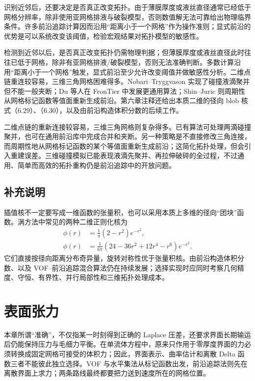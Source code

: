 \documentclass[11pt,a4paper,openany,fontset=none]{ctexbook}
\begin{document}
识别近邻后，还要决定是否真正改变拓扑。由于薄膜厚度或液丝直径通常已经低于网格分辨率，除非使用亚网格排液与破裂模型，否则数值解无法可靠给出物理临界条件。许多前沿追踪计算因而沿用“距离小于一个网格”作为操作准则；显式前沿的优势是可以系统改变该阈值，检验宏观结果对拓扑模型的敏感性。

检测到近邻以后，是否真正改变拓扑仍需物理判据；但薄膜厚度或液丝直径此时往往已低于网格，除非有亚网格排液/破裂模型，否则无法准确判断。多数计算沿用“距离小于一个网格”触发，显式前沿至少允许改变阈值并做敏感性分析。二维点链重连较容易，三维三角网格困难得多。Nobari--Tryggvason 实现了碰撞液滴聚并但不能一般夹断；Du 等人在 FronTier 中发展更通用算法；Shin--Juric 则周期性从网格标记函数等值面重新生成前沿。第六章注释还给出本质二维的径向 blob 核式（6.29）、（6.30），以及由前沿构造体积分数的后续工作。

二维点链的重新连接较容易，三维三角网格则复杂得多。已有算法可处理两滴碰撞聚并，也可在通用前沿库中完成合并和夹断。另一种策略是不直接修改三角连接，而周期性地从网格标记函数的某个等值面重新生成前沿；这简化拓扑处理，但会引入重建误差。三维碰撞模拟已能表现液滴先聚并、再拉伸破碎的全过程，不过通用、简单而高效的拓扑重构仍是前沿追踪中的开放问题。

\section{补充说明}

插值核不一定要写成一维函数的张量积，也可以采用本质上多维的径向“团块”函数。涡方法中常见的两种二维正则化核为
\begin{align}
\phi(r)&=\frac1\pi(2-r^2)e^{-r^2},
\tag{6.29}\\
\phi(r)&=\frac1{6\pi}(24-36r^2+12r^4-r^6)e^{-r^2}.
\tag{6.30}
\end{align}
它们直接按径向距离分布奇异量，旋转对称性优于张量积核。由前沿构造体积分数、以及 VOF--前沿追踪混合算法仍在持续发展；选择实现时应同时考察几何精度、守恒、有界性、并行局部性和三维拓扑处理成本。

\chapter{表面张力}

本章所谓“准确”，不仅指某一时刻得到正确的 Laplace 压差，还要求界面长期输运后仍能保持压力与毛细力平衡。在单流体方程中，原来只作用于零厚度界面的力必须转换成固定网格可接受的体积力；因此，界面表示、曲率估计和离散 Delta 函数三者不能彼此独立选择。VOF 与水平集法从标记函数出发，前沿追踪法则先在离散界面上求力；两条路线最终都要把力送到速度所在的网格位置。
\end{document}
